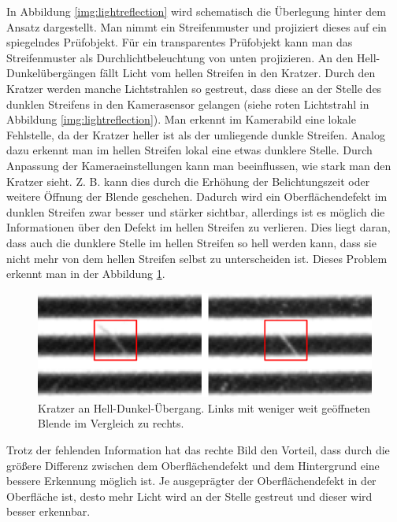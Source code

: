 \noindent
In Abbildung \ref{img:lightreflection} wird schematisch die Überlegung hinter dem Ansatz dargestellt.
Man nimmt ein Streifenmuster und projiziert dieses auf ein spiegelndes Prüfobjekt.
Für ein transparentes Prüfobjekt kann man das Streifenmuster als Durchlichtbeleuchtung von unten projizieren.
An den Hell-Dunkelübergängen fällt Licht vom hellen Streifen in den Kratzer.
Durch den Kratzer werden manche Lichtstrahlen so gestreut, dass diese an der Stelle des dunklen Streifens in den Kamerasensor gelangen (siehe roten Lichtstrahl in Abbildung \ref{img:lightreflection}).
Man erkennt im Kamerabild eine lokale Fehlstelle, da der Kratzer heller ist als der umliegende dunkle Streifen.
Analog dazu erkennt man im hellen Streifen lokal eine etwas dunklere Stelle.
Durch Anpassung der Kameraeinstellungen kann man beeinflussen, wie stark man den Kratzer sieht.
Z. B. kann dies durch die Erhöhung der Belichtungszeit oder weitere Öffnung der Blende geschehen.
Dadurch wird ein Oberflächendefekt im dunklen Streifen zwar besser und stärker sichtbar, allerdings ist es möglich die Informationen über den Defekt im hellen Streifen zu verlieren.
Dies liegt daran, dass auch die dunklere Stelle im hellen Streifen so hell werden kann, dass sie nicht mehr von dem hellen Streifen selbst zu unterscheiden ist.
Dieses Problem erkennt man in der Abbildung \ref{img:scratches}.

\begin{figure}[H]
	\centering
	\includegraphics[width=\textwidth]{03_sichtpruefungDurchLichtstreuung/verfahren/figures/visibleScratch}
	\caption[Kratzer]{Kratzer an Hell-Dunkel-Übergang. Links mit weniger weit geöffneten Blende im Vergleich zu rechts.}
	\label{img:scratches}
\end{figure}

\noindent
Trotz der fehlenden Information hat das rechte Bild den Vorteil, dass durch die größere Differenz zwischen dem Oberflächendefekt und dem Hintergrund eine bessere Erkennung möglich ist.
Je ausgeprägter der Oberflächendefekt in der Oberfläche ist, desto mehr Licht wird an der Stelle gestreut und dieser wird besser erkennbar.

